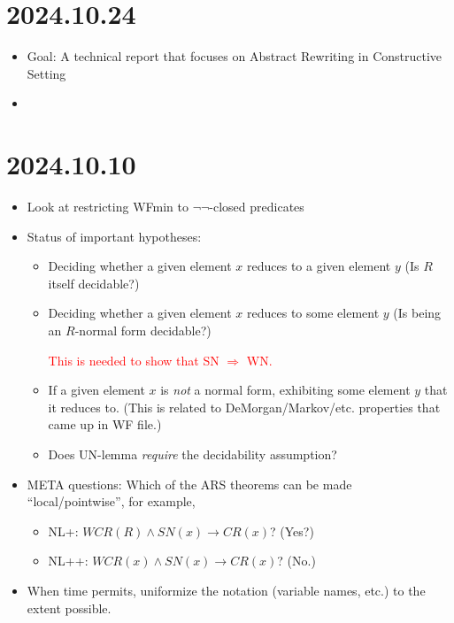 \documentclass{scrartcl}
\begin{document}
\section{2024.10.24}

\begin{itemize}
  \item Goal: A technical report that focuses on
  Abstract Rewriting in Constructive Setting 
  \item
\end{itemize}

\section{2024.10.10}

\begin{itemize}
  \item Look at restricting WFmin to $\lnot\lnot$-closed predicates
  \item Status of important hypotheses:
    \begin{itemize}
      \item Deciding whether a given element $x$ reduces to a given element $y$
      (Is $R$ itself decidable?)
      \item Deciding whether a given element $x$ reduces to some element $y$
      (Is being an $R$-normal form decidable?)

      {\textcolor{red}{This is needed to show that SN $\Rightarrow$ WN.}}

      \item If a given element $x$ is \emph{not} a normal form,
      exhibiting some element $y$ that it reduces to.
      (This is related to DeMorgan/Markov/etc. properties that came up in WF file.)

      \item Does UN-lemma \emph{require} the decidability assumption?
    \end{itemize}
  \item META questions: Which of the ARS theorems can be made ``local/pointwise'',
  for example,
  \begin{itemize}
    \item NL+: $WCR(R) \land SN(x) \to CR(x)$?  (Yes?)
    \item NL++: $WCR(x) \land SN(x) \to CR(x)$? (No.)
  \end{itemize}
  \item When time permits, uniformize the notation (variable names, etc.) to the extent possible.
\end{itemize}
\end{document}

